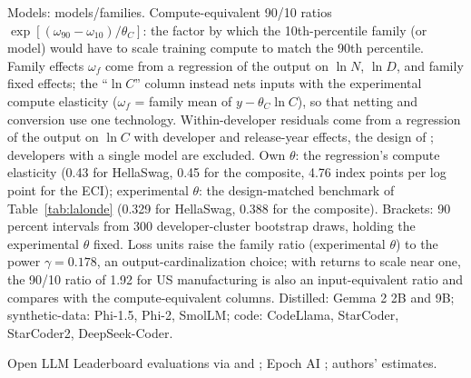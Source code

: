 \begin{table}[tp]
\par\smallskip
\begin{tablenotes}Models: models/families. Compute-equivalent 90/10 ratios $\exp[(\omega_{90}-\omega_{10})/\theta_C]$: the factor by which the
10th-percentile family (or model) would have to scale training compute to match the 90th percentile. Family effects
$\omega_f$ come from a regression of the output on $\ln N$, $\ln D$, and family fixed effects; the ``$\ln C$'' column
instead nets inputs with the experimental compute elasticity ($\omega_f$ = family mean of $y-\theta_C\ln C$), so that
netting and conversion use one technology. Within-developer residuals come from a regression of the output on $\ln C$
with developer and release-year effects, the design of \citet{mertens2026secret}; developers with a single model are
excluded. Own $\theta$: the regression's compute elasticity (0.43 for HellaSwag, 0.45 for the composite, 4.76 index
points per log point for the ECI); experimental $\theta$: the design-matched benchmark of Table~\ref{tab:lalonde}
(0.329 for HellaSwag, 0.388 for the composite). Brackets: 90 percent intervals from 300 developer-cluster bootstrap
draws, holding the experimental $\theta$ fixed. Loss units raise the family ratio (experimental $\theta$) to the
power $\gamma=0.178$, an output-cardinalization choice; with returns to scale near one, the 90/10 ratio of 1.92 for
US manufacturing \citep{syverson2011determines} is also an input-equivalent ratio and compares with the
compute-equivalent columns. Distilled: Gemma 2 2B and 9B; synthetic-data: Phi-1.5, Phi-2, SmolLM; code: CodeLlama,
StarCoder, StarCoder2, DeepSeek-Coder.\end{tablenotes}
\begin{tablenotes}[Source]Open LLM Leaderboard evaluations via \citet{ruan2024observational} and
\citet{maiapolo2024sloth}; Epoch AI \citep{epochai2026data,epochai2026capabilities}; authors'
estimates.\end{tablenotes}
\end{table}
